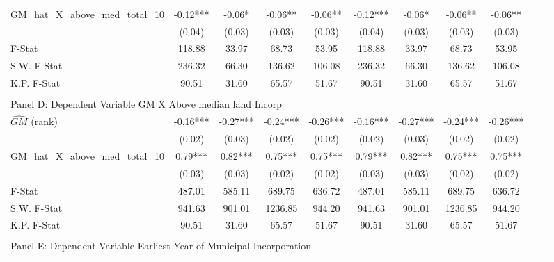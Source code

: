 \begin{table}[htbp]
\begin{threeparttable}
\begin{tabular}{l*{10}{c}}
\addlinespace
GM\_hat\_X\_above\_med\_total\_10&      -0.12***&      -0.06*  &      -0.06** &      -0.06** &      -0.12***&      -0.06*  &      -0.06** &      -0.06** \\
                &     (0.04)   &     (0.03)   &     (0.03)   &     (0.03)   &     (0.04)   &     (0.03)   &     (0.03)   &     (0.03)   \\
\midrule
F-Stat          &     118.88   &      33.97   &      68.73   &      53.95   &     118.88   &      33.97   &      68.73   &      53.95   \\
S.W. F-Stat     &     236.32   &      66.30   &     136.62   &     106.08   &     236.32   &      66.30   &     136.62   &     106.08   \\
K.P. F-Stat     &      90.51   &      31.60   &      65.57   &      51.67   &      90.51   &      31.60   &      65.57   &      51.67   \\
\cmidrule[\heavyrulewidth](lr){1-9} \\ \cmidrule[\heavyrulewidth](lr){1-9}
\multicolumn{8}{l}{Panel D: Dependent Variable GM X Above median land Incorp}\\
\cmidrule(lr){1-9}
$\hat{GM}$ (rank)&      -0.16***&      -0.27***&      -0.24***&      -0.26***&      -0.16***&      -0.27***&      -0.24***&      -0.26***\\
                &     (0.02)   &     (0.03)   &     (0.02)   &     (0.02)   &     (0.02)   &     (0.03)   &     (0.02)   &     (0.02)   \\
\addlinespace
GM\_hat\_X\_above\_med\_total\_10&       0.79***&       0.82***&       0.75***&       0.75***&       0.79***&       0.82***&       0.75***&       0.75***\\
                &     (0.03)   &     (0.03)   &     (0.02)   &     (0.02)   &     (0.03)   &     (0.03)   &     (0.02)   &     (0.02)   \\
\midrule
F-Stat          &     487.01   &     585.11   &     689.75   &     636.72   &     487.01   &     585.11   &     689.75   &     636.72   \\
S.W. F-Stat     &     941.63   &     901.01   &    1236.85   &     944.20   &     941.63   &     901.01   &    1236.85   &     944.20   \\
K.P. F-Stat     &      90.51   &      31.60   &      65.57   &      51.67   &      90.51   &      31.60   &      65.57   &      51.67   \\
\cmidrule[\heavyrulewidth](lr){1-9} \\ \cmidrule[\heavyrulewidth](lr){1-9}
\multicolumn{8}{l}{Panel E: Dependent Variable Earliest Year of Municipal Incorporation}\\

\end{tabular}
\end{threeparttable}
\end{table}
